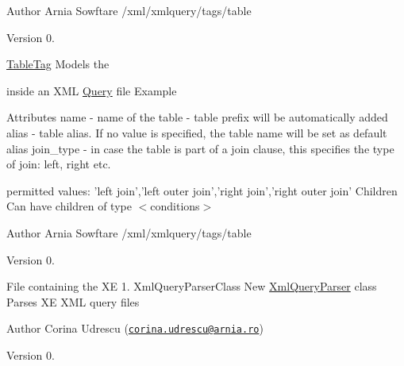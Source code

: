 \begin{DoxyAuthor}{Author}
Arnia Sowftare /xml/xmlquery/tags/table 
\end{DoxyAuthor}
\begin{DoxyVersion}{Version}
0.
\end{DoxyVersion}
\hyperlink{classTableTag}{Table\+Tag} Models the \begin{TabularC}{0}
\hline
\end{TabularC}
inside an X\+M\+L \hyperlink{classQuery}{Query} file  Example \begin{TabularC}{0}
\hline
\end{TabularC}
Attributes name -\/ name of the table -\/ table prefix will be automatically added alias -\/ table alias. If no value is specified, the table name will be set as default alias join\+\_\+type -\/ in case the table is part of a join clause, this specifies the type of join\+: left, right etc.
\begin{DoxyItemize}
\item permitted values\+: 'left join','left outer join','right join','right outer join' Children Can have children of type $<$conditions$>$
\end{DoxyItemize}

\begin{DoxyAuthor}{Author}
Arnia Sowftare /xml/xmlquery/tags/table 
\end{DoxyAuthor}
\begin{DoxyVersion}{Version}
0.
\end{DoxyVersion}
File containing the X\+E 1. Xml\+Query\+Parser\+Class New \hyperlink{classXmlQueryParser}{Xml\+Query\+Parser} class ~\newline
 Parses X\+E X\+M\+L query files

\begin{DoxyAuthor}{Author}
Corina Udrescu (\href{mailto:corina.udrescu@arnia.ro}{\tt corina.\+udrescu@arnia.\+ro})  
\end{DoxyAuthor}
\begin{DoxyVersion}{Version}
0. 
\end{DoxyVersion}
